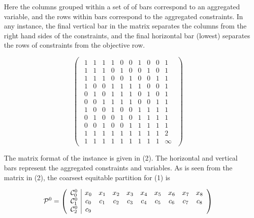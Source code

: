 \documentclass[11pt]{article} %
\newcommand{\cC}{{\cal C}}
\begin{document}
	Here the columns grouped within a set of of bars correspond to an aggregated variable, and the rows within bars correspond to the aggregated constraints.  In any instance, the final vertical bar in the matrix separates the columns from the right hand sides of the constraints, and the final horizontal bar (lowest) separates the rows of constraints from the objective row.
	
\begin{equation}
 	\begin{pmatrix}
 		\begin{array}{ccccccccc|c}
 			1 & 1 & 1 & 1 & 0 & 0 & 1 & 0 & 0 & 1 \\ 
 			1 & 1 & 1 & 0 & 1 & 0 & 0 & 1 & 0 &  1 \\ 
 			1 & 1 & 1 & 0 & 0 & 1 & 0 & 0 & 1 & 1 \\ 
 			1 & 0 & 0 & 1 & 1 & 1 & 1 & 0 & 0 & 1 \\ 
 			0 & 1 & 0 & 1 & 1 & 1 & 0 & 1 & 0 & 1 \\ 
 			0 & 0 & 1 & 1 & 1 & 1 & 0 & 0 & 1 & 1 \\ 
 			1 & 0 & 0 & 1 & 0 & 0 & 1 & 1 & 1 & 1 \\ 
 			0 & 1 & 0 & 0 & 1 & 0 & 1 & 1 & 1 & 1 \\ 
 			0 & 0 & 1 & 0 & 0 & 1 & 1 & 1 & 1 & 1 \\ 
 			\hline
 			1 & 1 & 1 & 1 & 1 & 1 & 1 & 1 & 1 & 2 \\ 
 			\hline
 			1 & 1 & 1 & 1 & 1 & 1 & 1 & 1 & 1 & \infty
 		\end{array}
 	\end{pmatrix}
 \end{equation}
 
	 The matrix format of the instance is given in (2).  The horizontal and vertical bars represent the aggregated constraints and variables. As is seen from the matrix in (2), the coarsest equitable partition for (1) is
	 
	 \begin{equation}
	 	\mathcal{P}^0 = 
	 	\begin{pmatrix} 
	 	\begin{array}{c|ccccccccc}
	 	\cC_0^0 & x_0 & x_1 & x_2 & x_3 & x_4 & x_5 & x_6 & x_7 & x_8 \\
	 	\cC_1^0 & c_0 & c_1 & c_2 & c_3 & c_4 & c_5 & c_6 & c_7 & c_8 \\
	 	\cC_2^0 & c_9
	 	\end{array}
	 	\end{pmatrix} 
	 \end{equation}
	 
\end{document}
